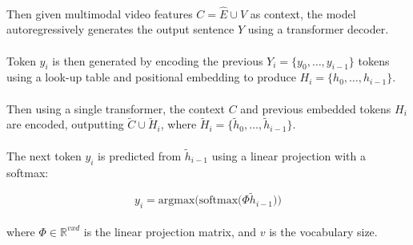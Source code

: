 \documentclass{article}
\begin{document}
\paragraph{}Then given multimodal video features $C = \hat{E} \cup \hat{V}$ as context, the model
autoregressively generates the output sentence $Y$ using a transformer decoder.

\paragraph{}Token $y_i$ is then generated by encoding the previous $Y_i = \{y_0, \ldots, y_{i-1}\}$ tokens
using a look-up table and positional embedding to produce $H_i = \{h_0,\ldots, h_{i-1}\}$.

\paragraph{}Then using a single transformer, the context $C$ and previous embedded tokens $H_i$ are
encoded, outputting $\tilde{C}\cup \tilde{H}_i$, where $\tilde{H}_i = \{\tilde{h}_0,\ldots,\tilde{h}_{i-1}\}$.


\paragraph{}The next token $y_i$ is predicted from $\tilde{h}_{i-1}$ using a linear projection with a softmax:

\[
    y_i = \text{argmax(softmax(}\Phi \tilde{h}_{i-1}))
\]
\paragraph{}where $\Phi \in \mathbb{R}^{v x d}$ is the linear projection matrix, and $v$ is the vocabulary
size.
\end{document}
